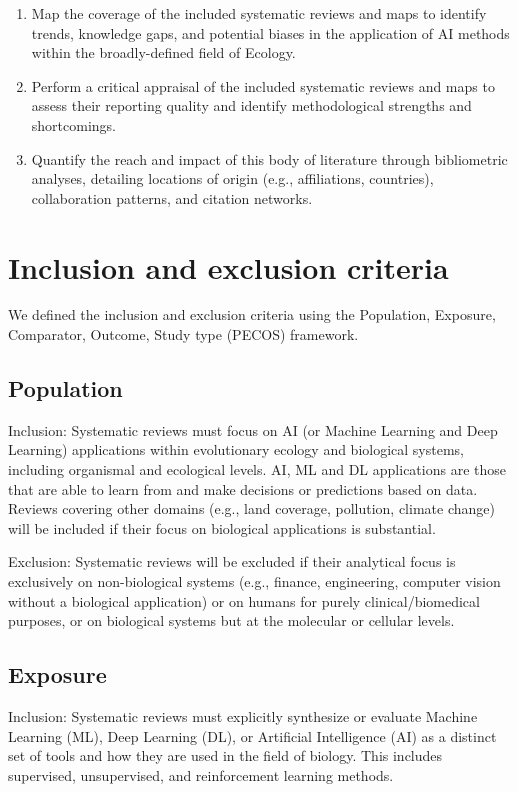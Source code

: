 \documentclass{article}
\newcommand{\ben}{\begin{enumerate}}
\newcommand{\een}{\end{enumerate}}
\begin{document}
\ben
\item Map the coverage of the included systematic reviews and maps to identify trends, knowledge gaps, and potential biases in the application of AI methods within the broadly-defined field of Ecology.
\item Perform a critical appraisal of the included systematic reviews and maps to assess their reporting quality and identify methodological strengths and shortcomings. 
\item Quantify the reach and impact of this body of literature through bibliometric analyses, detailing locations of origin (e.g., affiliations, countries), collaboration patterns, and citation networks.
\een

\section{Inclusion and exclusion criteria}
We defined the inclusion and exclusion criteria using the Population, Exposure, Comparator, Outcome, Study type (PECOS) framework.
\label{sec:criteria}
\subsection{Population}
Inclusion: Systematic reviews must focus on AI (or Machine Learning and Deep Learning) applications within evolutionary ecology and biological systems, including organismal and ecological levels. AI, ML and DL applications are those that are able to learn from and make decisions or predictions based on data. Reviews covering other domains (e.g., land coverage, pollution, climate change) will be included if their focus on biological applications is substantial.

Exclusion: Systematic reviews will be excluded if their analytical focus is exclusively on non-biological systems (e.g., finance, engineering, computer vision without a biological application) or on humans for purely clinical/biomedical purposes, or on biological systems but at the molecular or cellular levels.

\subsection{Exposure}
Inclusion: Systematic reviews must explicitly synthesize or evaluate Machine Learning (ML), Deep Learning (DL), or Artificial Intelligence (AI) as a distinct set of tools and how they are used in the field of biology. This includes supervised, unsupervised, and reinforcement learning methods.
\end{document}
